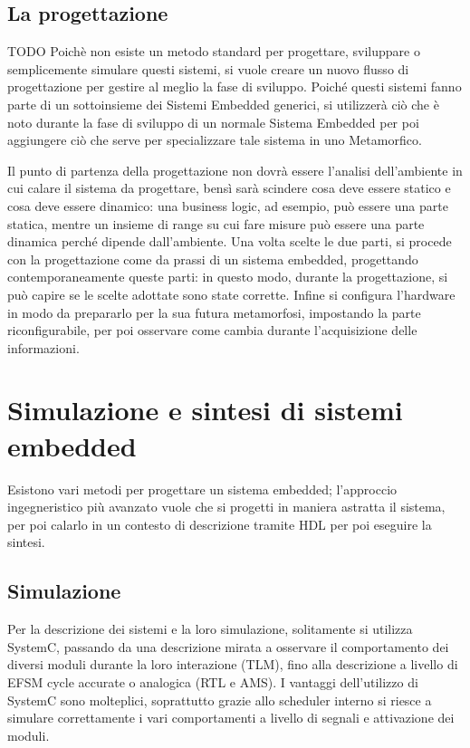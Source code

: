 \documentclass[a4paper,titlepage]{book}
\begin{document}
\subsection{La progettazione}
TODO
Poichè non esiste un metodo standard per progettare, sviluppare o semplicemente simulare questi sistemi, si vuole creare un nuovo flusso di progettazione per gestire al meglio la fase di sviluppo. Poiché questi sistemi fanno parte di un sottoinsieme dei Sistemi Embedded generici, si utilizzerà ciò che è noto durante la fase di sviluppo di un normale Sistema Embedded per poi aggiungere ciò che serve per specializzare tale sistema in uno Metamorfico.

Il punto di partenza della progettazione non dovrà essere l'analisi dell'ambiente in cui calare il sistema da progettare, bensì sarà scindere cosa deve essere statico e cosa deve essere dinamico: una business logic, ad esempio, può essere una parte statica, mentre un insieme di range su cui fare misure può essere una parte dinamica perché dipende dall'ambiente. Una volta scelte le due parti, si procede con la progettazione come da prassi di un sistema embedded, progettando contemporaneamente queste parti: in questo modo, durante la progettazione, si può capire se le scelte adottate sono state corrette. Infine si configura l'hardware in modo da prepararlo per la sua futura metamorfosi, impostando la parte riconfigurabile, per poi osservare come cambia durante l'acquisizione delle informazioni.

\section{Simulazione e sintesi di sistemi embedded}

Esistono vari metodi per progettare un sistema embedded; l'approccio ingegneristico più avanzato vuole che si progetti in maniera astratta il sistema, per poi calarlo in un contesto di descrizione tramite HDL per poi eseguire la sintesi.

\subsection{Simulazione}

Per la descrizione dei sistemi e la loro simulazione, solitamente si utilizza SystemC, passando da una descrizione mirata a osservare il comportamento dei diversi moduli durante la loro interazione (TLM), fino alla descrizione a livello di EFSM cycle accurate o analogica (RTL e AMS). I vantaggi dell'utilizzo di SystemC sono molteplici, soprattutto grazie allo scheduler interno si riesce a simulare correttamente i vari comportamenti a livello di segnali e attivazione dei moduli.
\end{document}
